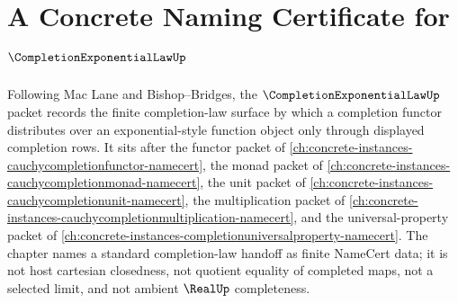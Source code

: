 \chapter{A Concrete Naming Certificate for $\CompletionExponentialLawUp$}
\label{ch:concrete-instances-completion-exponential-law-namecert}

Following Mac Lane and Bishop--Bridges, the $\CompletionExponentialLawUp$ packet records the finite completion-law surface by which a completion functor distributes over an exponential-style function object only through displayed completion rows. It sits after the functor packet of \autoref{ch:concrete-instances-cauchycompletionfunctor-namecert}, the monad packet of \autoref{ch:concrete-instances-cauchycompletionmonad-namecert}, the unit packet of \autoref{ch:concrete-instances-cauchycompletionunit-namecert}, the multiplication packet of \autoref{ch:concrete-instances-cauchycompletionmultiplication-namecert}, and the universal-property packet of \autoref{ch:concrete-instances-completionuniversalproperty-namecert}. The chapter names a standard completion-law handoff as finite NameCert data; it is not host cartesian closedness, not quotient equality of completed maps, not a selected limit, and not ambient $\RealUp$ completeness.

